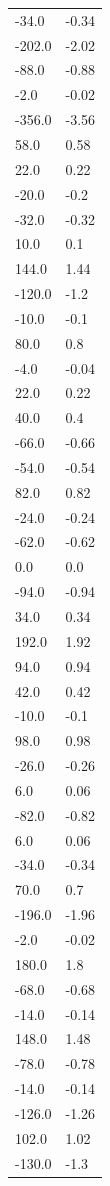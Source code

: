 \begin{longtable}{ll}
-34.0 & -0.34 \\
-202.0 & -2.02 \\
-88.0 & -0.88 \\
-2.0 & -0.02 \\
-356.0 & -3.56 \\
58.0 & 0.58 \\
22.0 & 0.22 \\
-20.0 & -0.2 \\
-32.0 & -0.32 \\
10.0 & 0.1 \\
144.0 & 1.44 \\
-120.0 & -1.2 \\
-10.0 & -0.1 \\
80.0 & 0.8 \\
-4.0 & -0.04 \\
22.0 & 0.22 \\
40.0 & 0.4 \\
-66.0 & -0.66 \\
-54.0 & -0.54 \\
82.0 & 0.82 \\
-24.0 & -0.24 \\
-62.0 & -0.62 \\
0.0 & 0.0 \\
-94.0 & -0.94 \\
34.0 & 0.34 \\
192.0 & 1.92 \\
94.0 & 0.94 \\
42.0 & 0.42 \\
-10.0 & -0.1 \\
98.0 & 0.98 \\
-26.0 & -0.26 \\
6.0 & 0.06 \\
-82.0 & -0.82 \\
6.0 & 0.06 \\
-34.0 & -0.34 \\
70.0 & 0.7 \\
-196.0 & -1.96 \\
-2.0 & -0.02 \\
180.0 & 1.8 \\
-68.0 & -0.68 \\
-14.0 & -0.14 \\
148.0 & 1.48 \\
-78.0 & -0.78 \\
-14.0 & -0.14 \\
-126.0 & -1.26 \\
102.0 & 1.02 \\
-130.0 & -1.3 \\

\end{longtable}
